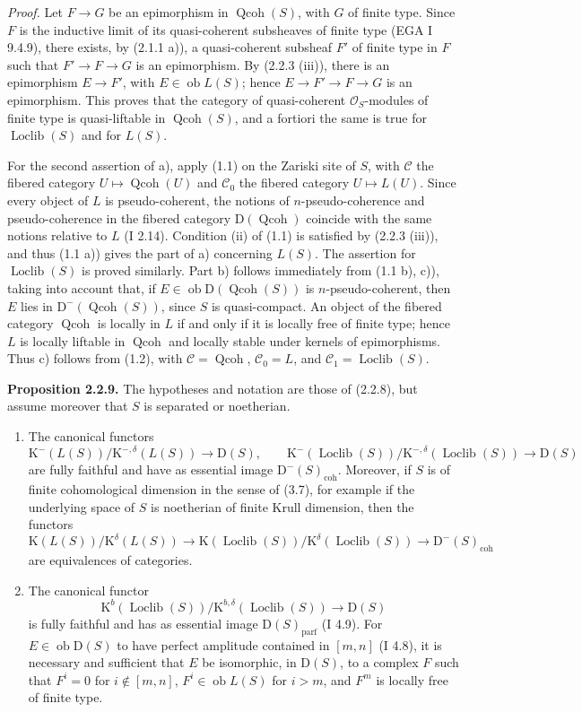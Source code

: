\documentclass[11pt]{article}
\providecommand{\Loclib}{\operatorname{Loclib}}
\providecommand{\Qcoh}{\operatorname{Qcoh}}
\providecommand{\Ob}{\operatorname{ob}}
\providecommand{\coh}{\operatorname{coh}}
\providecommand{\parf}{\operatorname{parf}}
\begin{document}
\emph{Proof.} Let $F\to G$ be an epimorphism in $\Qcoh(S)$, with $G$ of finite type. Since $F$ is the inductive limit of its quasi-coherent subsheaves of finite type (EGA I 9.4.9), there exists, by (2.1.1 a)), a quasi-coherent subsheaf $F'$ of finite type in $F$ such that $F'\to F\to G$ is an epimorphism. By (2.2.3 (iii)), there is an epimorphism $E\to F'$, with $E\in\Ob L(S)$; hence $E\to F'\to F\to G$ is an epimorphism. This proves that the category of quasi-coherent $\mathcal O_S$-modules of finite type is quasi-liftable in $\Qcoh(S)$, and a fortiori the same is true for $\Loclib(S)$ and for $L(S)$.

For the second assertion of a), apply (1.1) on the Zariski site of $S$, with $\mathcal C$ the fibered category $U\mapsto\Qcoh(U)$ and $\mathcal C_0$ the fibered category $U\mapsto L(U)$. Since every object of $L$ is pseudo-coherent, the notions of $n$-pseudo-coherence and pseudo-coherence in the fibered category $\mathrm D(\Qcoh)$ coincide with the same notions relative to $L$ (I 2.14). Condition (ii) of (1.1) is satisfied by (2.2.3 (iii)), and thus (1.1 a)) gives the part of a) concerning $L(S)$. The assertion for $\Loclib(S)$ is proved similarly. Part b) follows immediately from (1.1 b), c)), taking into account that, if $E\in\Ob\mathrm D(\Qcoh(S))$ is $n$-pseudo-coherent, then $E$ lies in $\mathrm D^{-}(\Qcoh(S))$, since $S$ is quasi-compact. An object of the fibered category $\Qcoh$ is locally in $L$ if and only if it is locally free of finite type; hence $L$ is locally liftable in $\Qcoh$ and locally stable under kernels of epimorphisms. Thus c) follows from (1.2), with $\mathcal C=\Qcoh$, $\mathcal C_0=L$, and $\mathcal C_1=\Loclib(S)$.

\textbf{Proposition 2.2.9.} The hypotheses and notation are those of (2.2.8), but assume moreover that $S$ is separated or noetherian.
\begin{enumerate}[label=\alph*)]
\item The canonical functors
\[
\mathrm K^{-}(L(S))/\mathrm K^{-,\delta}(L(S))\longrightarrow \mathrm D(S),
\qquad
\mathrm K^{-}(\Loclib(S))/\mathrm K^{-,\delta}(\Loclib(S))\longrightarrow \mathrm D(S)
\]
are fully faithful and have as essential image $\mathrm D^{-}(S)_{\coh}$. Moreover, if $S$ is of finite cohomological dimension in the sense of (3.7), for example if the underlying space of $S$ is noetherian of finite Krull dimension, then the functors
\[
\mathrm K(L(S))/\mathrm K^{\delta}(L(S))\longrightarrow
\mathrm K(\Loclib(S))/\mathrm K^{\delta}(\Loclib(S))\longrightarrow
\mathrm D^{-}(S)_{\coh}
\]
are equivalences of categories.
\item The canonical functor
\[
\mathrm K^b(\Loclib(S))/\mathrm K^{b,\delta}(\Loclib(S))\longrightarrow \mathrm D(S)
\]
is fully faithful and has as essential image $\mathrm D(S)_{\parf}$ (I 4.9). For $E\in\Ob\mathrm D(S)$ to have perfect amplitude contained in $[m,n]$ (I 4.8), it is necessary and sufficient that $E$ be isomorphic, in $\mathrm D(S)$, to a complex $F$ such that $F^i=0$ for $i\notin[m,n]$, $F^i\in\Ob L(S)$ for $i>m$, and $F^m$ is locally free of finite type.
\end{enumerate}
\end{document}
